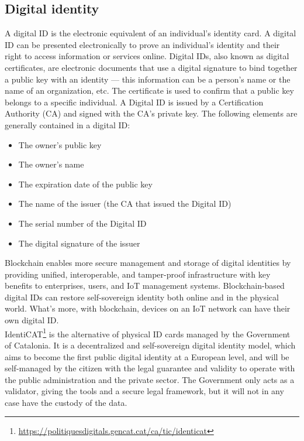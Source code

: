 \documentclass[10pt]{article}
\begin{document}
\begin{multicols}{2}
\subsection{Digital identity}

A digital ID is the electronic equivalent of an individual's identity card. A digital ID can be presented electronically to prove an individual's identity and their right to access information or services online. Digital IDs, also known as digital certificates, are electronic documents that use a digital signature to bind together a public key with an identity — this information can be a person's name or the name of an organization, etc. The certificate is used to confirm that a public key belongs to a specific individual. A Digital ID is issued by a Certification Authority (CA) and signed with the CA's private key. The following elements are generally contained in a digital ID:

\begin{itemize}
	\item The owner's public key
	\item The owner's name
	\item The expiration date of the public key
	\item The name of the issuer (the CA that issued the Digital ID)
	\item The serial number of the Digital ID
	\item The digital signature of the issuer
\end{itemize}

Blockchain enables more secure management and storage of digital identities by providing unified, interoperable, and tamper-proof infrastructure with key benefits to enterprises, users, and IoT management systems. Blockchain-based digital IDs can restore self-sovereign identity both online and in the physical world. What's more, with blockchain, devices on an IoT network can have their own digital ID.\\

IdentiCAT\footnote{\url{https://politiquesdigitals.gencat.cat/ca/tic/identicat}} is the alternative of physical ID cards managed by the Government of Catalonia. It is a decentralized and self-sovereign digital identity model, which aims to become the first public digital identity at a European level, and will be self-managed by the citizen with the legal guarantee and validity to operate with the public administration and the private sector. The Government only acts as a validator, giving the tools and a secure legal framework, but it will not in any case have the custody of the data.\\


\end{multicols}
\end{document}
